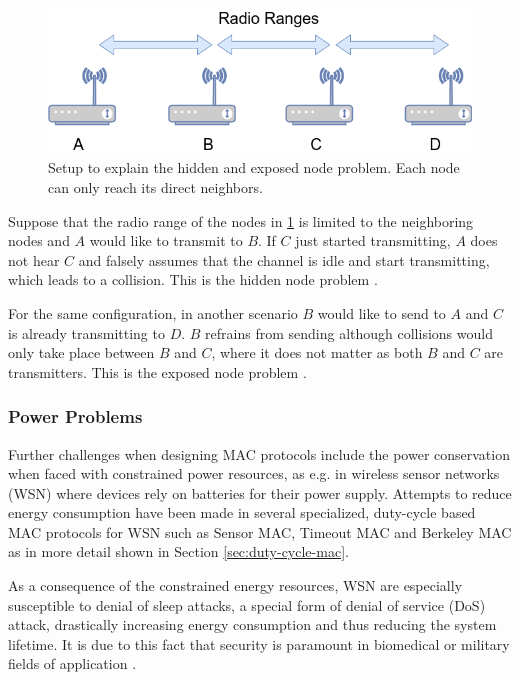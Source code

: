 \begin{figure}[tb]
	\label{fig:hidden_exposed_node_problem}
	\begin{center}
		\includegraphics[width=12cm]{pictures/hidden_exposed_node_problem}
	\end{center}
	\caption[Setup to explain the hidden and exposed node problem.]{Setup to explain the hidden and exposed node problem. Each node can only reach its direct neighbors.}
\end{figure}

Suppose that the radio range of the nodes in \ref{fig:hidden_exposed_node_problem} is limited to the neighboring nodes and $A$ would like to transmit to $B$. If $C$ just started transmitting, $A$ does not hear $C$ and falsely assumes that the channel is idle and start transmitting, which leads to a collision. This is the hidden node problem \cite{Tanenbaum02}\cite{Gast05}.

For the same configuration, in another scenario $B$ would like to send to $A$ and $C$ is already transmitting to $D$. $B$ refrains from sending although collisions would only take place between $B$ and $C$, where it does not matter as both $B$ and $C$ are transmitters. This is the exposed node problem \cite{Tanenbaum02}\cite{Gast05} . 

\subsubsection{Power Problems}

Further challenges when designing MAC protocols include the power conservation when faced with constrained power resources, as e.g. in wireless sensor networks (WSN) where devices rely on batteries for their power supply. Attempts to reduce energy consumption have been made in several specialized, duty-cycle based MAC protocols for WSN such as Sensor MAC, Timeout MAC and Berkeley MAC as in more detail shown in Section \ref{sec:duty-cycle-mac}.

As a consequence of the constrained energy resources, WSN are especially susceptible to denial of sleep attacks, a special form of denial of service (DoS) attack, drastically increasing energy consumption and thus reducing the system lifetime. It is due to this fact that security is paramount in biomedical or military fields of application \cite{raymond09}. 


